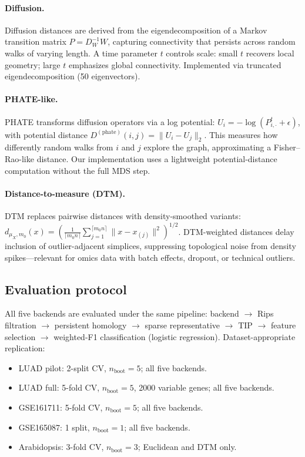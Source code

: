 \documentclass[12pt]{article}
\begin{document}
\paragraph{Diffusion.}
Diffusion distances \citep{coifman2006diffusion} are derived from the eigendecomposition of a Markov transition matrix $P = D_W^{-1}W$, capturing connectivity that persists across random walks of varying length.
A time parameter $t$ controls scale: small $t$ recovers local geometry; large $t$ emphasizes global connectivity.
Implemented via truncated eigendecomposition (50 eigenvectors).

\paragraph{PHATE-like.}
PHATE \citep{moon2019phate} transforms diffusion operators via a log potential: $U_i = -\log(P^t_{i,\cdot} + \epsilon)$, with potential distance $D^{(\text{phate})}(i,j) = \|U_i - U_j\|_2$.
This measures how differently random walks from $i$ and $j$ explore the graph, approximating a Fisher--Rao-like distance.
Our implementation uses a lightweight potential-distance computation without the full MDS step.

\paragraph{Distance-to-measure (DTM).}
DTM \citep{chazal2011dtm, chazal2017robust} replaces pairwise distances with density-smoothed variants: $d_{\mu_X, m_0}(x) = (\frac{1}{\lceil m_0 n \rceil} \sum_{j=1}^{\lceil m_0 n \rceil} \|x - x_{(j)}\|^2)^{1/2}$.
DTM-weighted distances delay inclusion of outlier-adjacent simplices, suppressing topological noise from density spikes---relevant for omics data with batch effects, dropout, or technical outliers.

\subsection{Evaluation protocol}
\label{sec:evaluation}

All five backends are evaluated under the same pipeline: backend $\to$ Rips filtration $\to$ persistent homology $\to$ sparse representative $\to$ TIP $\to$ feature selection $\to$ weighted-F1 classification (logistic regression).
Dataset-appropriate replication:
\begin{itemize}[leftmargin=1.5em]
\item LUAD pilot: 2-split CV, $n_{\text{boot}} = 5$; all five backends.
\item LUAD full: 5-fold CV, $n_{\text{boot}} = 5$, 2000 variable genes; all five backends.
\item GSE161711: 5-fold CV, $n_{\text{boot}} = 5$; all five backends.
\item GSE165087: 1 split, $n_{\text{boot}} = 1$; all five backends.
\item Arabidopsis: 3-fold CV, $n_{\text{boot}} = 3$; Euclidean and DTM only.
\end{itemize}
\end{document}
